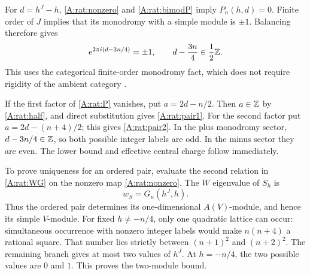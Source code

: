 \documentclass[11pt]{article}
\numberwithin{equation}{section}
\begin{document}
For $d=h^J-h$, \eqref{A:rat:nonzero} and \eqref{A:rat:bimodP} imply $P_n(h,d)=0$. Finite order of $J$ implies that its monodromy with a simple module is $\pm1$. Balancing therefore gives
\begin{equation}\label{A:rat:half}
 e^{2\pi i(d-3n/4)}=\pm1,\qquad
 d-\frac{3n}{4}\in\frac12\mathbb Z.
\end{equation}
This uses the categorical finite-order monodromy fact, which does not require rigidity of the ambient category \cite[Lemma 2.13]{A:CKL}.

If the first factor of \eqref{A:rat:P} vanishes, put $a=2d-n/2$. Then $a\in\mathbb Z$ by \eqref{A:rat:half}, and direct substitution gives \eqref{A:rat:pair1}. For the second factor put $a=2d-(n+4)/2$; this gives \eqref{A:rat:pair2}. In the plus monodromy sector, $d-3n/4\in\mathbb Z$, so both possible integer labels are odd. In the minus sector they are even. The lower bound and effective central charge follow immediately.

To prove uniqueness for an ordered pair, evaluate the second relation in \eqref{A:rat:WG} on the nonzero map \eqref{A:rat:nonzero}. The $W$ eigenvalue of $S_h$ is
\begin{equation}\label{A:rat:weightW}
 w_S=G_n(h^J,h).
\end{equation}
Thus the ordered pair determines its one-dimensional $A(V)$-module, and hence its simple $V$-module. For fixed $h\ne-n/4$, only one quadratic lattice can occur: simultaneous occurrence with nonzero integer labels would make $n(n+4)$ a rational square. That number lies strictly between $(n+1)^2$ and $(n+2)^2$. The remaining branch gives at most two values of $h^J$. At $h=-n/4$, the two possible values are $0$ and $1$. This proves the two-module bound.
\end{document}
